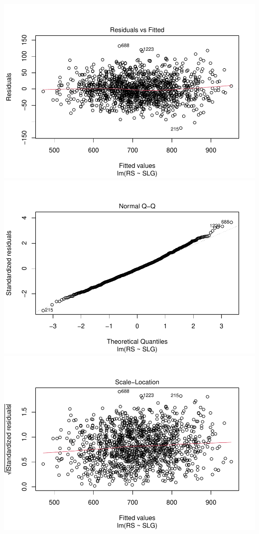\documentclass[
]{article}
\begin{document}
\includegraphics{HW2_Liu-Zi-Jian_files/figure-latex/unnamed-chunk-38-1.pdf}
\includegraphics{HW2_Liu-Zi-Jian_files/figure-latex/unnamed-chunk-38-2.pdf}
\includegraphics{HW2_Liu-Zi-Jian_files/figure-latex/unnamed-chunk-38-3.pdf}
\end{document}
